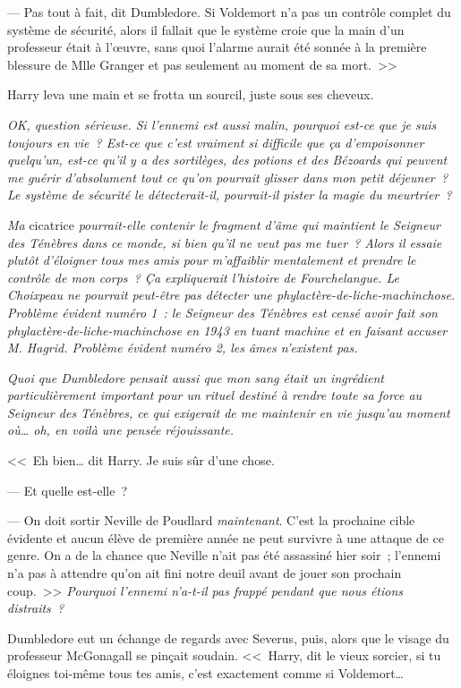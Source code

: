 --- Pas tout à fait, dit Dumbledore. Si Voldemort n'a pas un contrôle complet du système de sécurité, alors il fallait que le système croie que la main d'un professeur était à l'œuvre, sans quoi l'alarme aurait été sonnée à la première blessure de Mlle Granger et pas seulement au moment de sa mort.~>>

Harry leva une main et se frotta un sourcil, juste sous ses cheveux.

\emph{OK, question sérieuse. Si l'ennemi est aussi malin, pourquoi est-ce que je suis toujours en vie~? Est-ce que c'est vraiment si difficile que ça d'empoisonner quelqu'un, est-ce qu'il y a des sortilèges, des potions et des Bézoards qui peuvent me guérir d'absolument tout ce qu'on pourrait glisser dans mon petit déjeuner~? Le système de sécurité le détecterait-il, pourrait-il pister la magie du meurtrier~?}

\emph{Ma} cicatrice \emph{pourrait-elle contenir le fragment d'âme qui maintient le Seigneur des Ténèbres dans ce monde, si bien qu'il ne veut pas me tuer~? Alors il essaie plutôt d'éloigner tous mes amis pour m'affaiblir mentalement et prendre le contrôle de mon corps~? Ça expliquerait l'histoire de Fourchelangue. Le Choixpeau ne pourrait peut-être pas détecter une phylactère-de-liche-machinchose. Problème évident numéro 1~: le Seigneur des Ténèbres est censé avoir fait son phylactère-de-liche-machinchose en 1943 en tuant machine et en faisant accuser M. Hagrid. Problème évident numéro 2, les âmes n'existent pas.}

\emph{Quoi que Dumbledore pensait aussi que mon sang était un ingrédient particulièrement important pour un rituel destiné à rendre toute sa force au Seigneur des Ténèbres, ce qui exigerait de me maintenir en vie jusqu'au moment où… oh, en voilà une pensée réjouissante.}

<<~Eh bien… dit Harry. Je suis sûr d'une chose.

--- Et quelle est-elle~?

--- On doit sortir Neville de Poudlard \emph{maintenant}. C'est la prochaine cible évidente et aucun élève de première année ne peut survivre à une attaque de ce genre. On a de la chance que Neville n'ait pas été assassiné hier soir~; l'ennemi n'a pas à attendre qu'on ait fini notre deuil avant de jouer son prochain coup.~>> \emph{Pourquoi l'ennemi n'a-t-il pas frappé pendant que nous étions distraits~?}

Dumbledore eut un échange de regards avec Severus, puis, alors que le visage du professeur McGonagall se pinçait soudain. <<~Harry, dit le vieux sorcier, si tu éloignes toi-même tous tes amis, c'est exactement comme si Voldemort…

